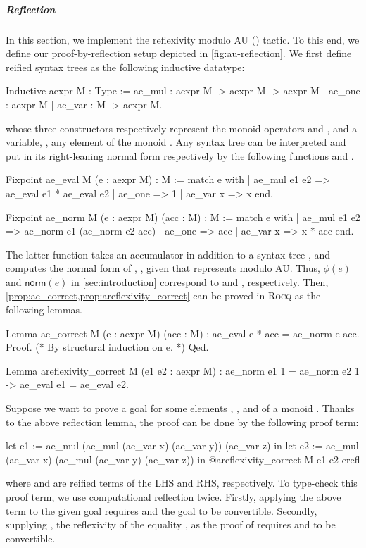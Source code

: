 \documentclass[a4paper,UKenglish,cleveref,autoref]{lipics-v2021}
\newcommand{\Rocq}{{\sffamily\scshape Rocq}\xspace}
\begin{document}
\subparagraph{Reflection}
In this section, we implement the reflexivity modulo AU () tactic.
To this end, we define our proof-by-reflection setup depicted in \cref{fig:au-reflection}.
We first define reified syntax trees as the following inductive datatype:
\begin{rocqcode}
Inductive aexpr M : Type :=
  ae_mul : aexpr M -> aexpr M -> aexpr M | ae_one : aexpr M | ae_var : M -> aexpr M.
\end{rocqcode}
whose three constructors respectively represent the monoid operators  and , and
a variable, \ie, any element of the monoid .
Any syntax tree can be interpreted and put in its right-leaning normal form respectively by the
following functions  and .
\begin{rocqcode}
Fixpoint ae_eval {M} (e : aexpr M) : M :=
  match e with
  | ae_mul e1 e2 => ae_eval e1 * ae_eval e2 | ae_one => 1 | ae_var x => x
  end.

Fixpoint ae_norm {M} (e : aexpr M) (acc : M) : M :=
  match e with
  | ae_mul e1 e2 => ae_norm e1 (ae_norm e2 acc)
  | ae_one => acc | ae_var x => x * acc
  end.
\end{rocqcode}
The latter function takes an accumulator  in addition to a syntax tree , and
computes the normal form of , \ie,  given that
 represents  modulo AU.
Thus, $\phi(e)$ and $\mathsf{norm}(e)$ in \cref{sec:introduction} correspond to 
and , respectively.
Then, \cref{prop:ae_correct,prop:areflexivity_correct} can be proved in \Rocq as the following
lemmas.
\begin{rocqcode}
Lemma ae_correct {M} (e : aexpr M) (acc : M) : ae_eval e * acc = ae_norm e acc.
Proof. (* By structural induction on \textup{e}. *) Qed.

Lemma areflexivity_correct {M} (e1 e2 : aexpr M) :
  ae_norm e1 1 = ae_norm e2 1 -> ae_eval e1 = ae_eval e2.
\end{rocqcode}

Suppose we want to prove a goal  for some elements ,
, and  of a monoid .
Thanks to the above reflection lemma, the proof can be done by the following proof term:
\begin{rocqcode}
let e1 := ae_mul (ae_mul (ae_var x) (ae_var y)) (ae_var z) in
let e2 := ae_mul (ae_var x) (ae_mul (ae_var y) (ae_var z)) in
@areflexivity_correct M e1 e2 erefl
\end{rocqcode}
where  and  are reified terms of the LHS and RHS, respectively.
To type-check this proof term, we use computational reflection twice.
Firstly, applying the above term to the given goal requires  and the
goal to be convertible.
Secondly, supplying , the reflexivity of the equality \rocq{=}, as the proof of
 requires  and  to be
convertible.
\end{document}
